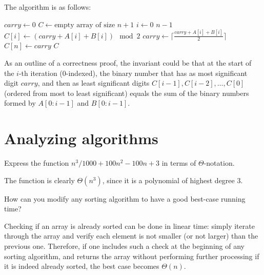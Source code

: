 \begin{solution}
    
    The algorithm is as follows:

    \begin{codebox}
        \li $carry \gets 0$
        \li $C \gets \text{empty array of size } n + 1$
        \li \For $i \gets 0$ \To $n - 1$
        \li \Do $C[i] \gets (carry + A[i] + B[i]) \mod 2$
        \li $carry \gets \lceil \frac{carry + A[i] + B[i]}{2} \rceil$
        \End
        \li $C[n] \gets carry$
        \li \Return $C$
    \end{codebox}    

    As an outline of a correctness proof, the invariant could be that at the start of the $i$-th iteration (0-indexed), the binary number that has as most significant digit $carry$, and then as least significant digits $C[i - 1], C[i - 2], \ldots, C[0]$ (ordered from most to least significant) equals the sum of the binary numbers formed by $A[0:i - 1]$ and $B[0:i - 1]$.

\end{solution}

\section{Analyzing algorithms}

\begin{exercise}{1}
    Express the function $n^3/1000 + 100n^2 - 100n + 3$ in terms of $\Theta$-notation.
\end{exercise}

\begin{solution}
    
    The function is clearly $\Theta(n^3)$, since it is a polynomial of highest degree 3.
\end{solution}

\begin{exercise}{2}
    
\end{exercise}

\begin{exercise}{4}
    How can you modify any sorting algorithm to have a good best-case running time?
\end{exercise}

\begin{solution}
    
    Checking if an array is already sorted can be done in linear time: simply iterate through the array and verify each element is not smaller (or not larger) than the previous one.
    Therefore, if one includes such a check at the beginning of any sorting algorithm, and returns the array without performing further processing if it is indeed already sorted, the best case becomes $\Theta(n)$.
\end{solution}